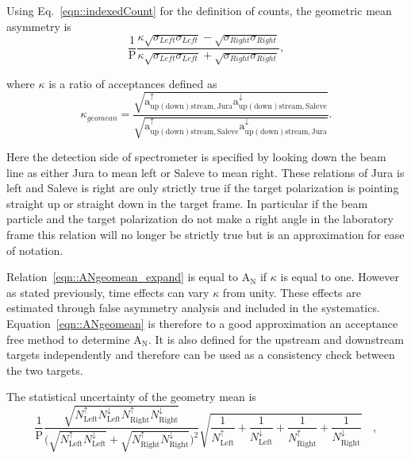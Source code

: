 Using Eq.~\ref{eqn::indexedCount} for the definition of counts, the geometric
mean asymmetry is
\begin{equation}
  \label{eqn::ANgeomean_expand}
  \frac{1}{\mathrm{P}}\frac{\kappa \sqrt{\sigma_{Left}\sigma_{Left}} -
    \sqrt{\sigma_{Right}\sigma_{Right}}}{\kappa \sqrt{\sigma_{Left}\sigma_{Left}}
    + \sqrt{\sigma_{Right}\sigma_{Right}}},
\end{equation}

\noindent
where $\kappa$ is a ratio of acceptances defined as
\begin{equation}
  \kappa_{geomean} =
  \frac{\sqrt{\mathrm{a}^{\uparrow}_{\mathrm{up(down)stream,Jura}}
      \mathrm{a}^{\downarrow}_{\mathrm{up(down)stream,Saleve}}}}
       {\sqrt{\mathrm{a}^{\uparrow}_{\mathrm{up(down)stream,Saleve}}
           \mathrm{a}^{\downarrow}_{\mathrm{up(down)stream,Jura}}}}.
       \label{equ::accGeoMean}
\end{equation}

\noindent
Here the detection side of spectrometer is specified by looking down the beam
line as either Jura to mean left or Saleve to mean right.  These relations of
Jura is left and Saleve is right are only strictly true if the target
polarization is pointing straight up or straight down in the target frame.  In
particular if the beam particle and the target polarization do not make a right
angle in the laboratory frame this relation will no longer be strictly true but
is an approximation for ease of notation.

Relation~\ref{eqn::ANgeomean_expand} is equal to A$_{\mathrm{N}}$ if $\kappa$ is
equal to one.  However as stated previously, time effects can vary $\kappa$ from
unity. These effects are estimated through false asymmetry analysis and included
in the systematics.  Equation~\ref{eqn::ANgeomean} is therefore to a good
approximation an acceptance free method to determine A$_{\mathrm{N}}$.  It is
also defined for the upstream and downstream targets independently and therefore
can be used as a consistency check between the two targets.

The statistical uncertainty of the geometry mean is
\begin{equation}
  \frac{1}{\mathrm{P}}
  \frac{
    \sqrt{
      N_{\mathrm{Left}}^{\uparrow}N_{\mathrm{Left}}^{\downarrow}
      N_{\mathrm{ Right}}^{\uparrow}N_{\mathrm{Right}}^{\downarrow}
    }
  }{
    \Big( \sqrt{N_{\mathrm{Left}}^{\uparrow}N_{\mathrm{Left}}^{\downarrow}} +
    \sqrt{N_{\mathrm{Right}}^{\uparrow}N_{\mathrm{Right}}^{\downarrow}} \Big)^2
  }
  \sqrt{
    \frac{1}{N_{\mathrm{Left}}^{\uparrow}} +
    \frac{1}{N_{\mathrm{Left}}^{\downarrow}} +
    \frac{1}{N_{\mathrm{Right}}^{\uparrow}} +
    \frac{1}{N_{\mathrm{Right}}^{\downarrow}}
  } \quad,
\end{equation}

